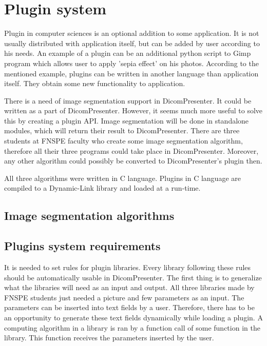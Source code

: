 \chapter*{Plugin system}

Plugin in computer sciences is an optional addition to some application. It is not usually distributed with application itself, but can be added by user according to his needs. An example of a plugin can be an additional python script to Gimp program which allows user to apply 'sepia effect' on his photos. According to the mentioned example, plugins can be written in another language than application itself. They obtain some new functionality to application.

There is a need of image segmentation support in DicomPresenter. It could be written as a part of DicomPresenter. However, it seems much more useful to solve this by creating a plugin API. Image segmentation will be done in standalone modules, which will return their result to DicomPresenter. There are three students at FNSPE faculty who create some image segmentation algorithm, therefore all their three programs could take place in DicomPresenter. Moreover, any other algorithm could possibly be converted to DicomPresenter's plugin then.

All three algorithms were written in C language. Plugins in C language are compiled to a Dynamic-Link library and loaded at a run-time.

\section*{Image segmentation algorithms}

\section*{Plugins system requirements}

It is needed to set rules for plugin libraries. Every library following these rules should be automatically usable in DicomPresenter. The first thing is to generalize what the libraries will need as an input and output. All three libraries made by FNSPE students just needed a picture and few parameters as an input. The parameters can be inserted into text fields by a user. Therefore, there has to be an opportunity to generate these text fields dynamically while loading a plugin. A computing algorithm in a library is ran by a function call of some function in the library. This function receives the parameters inserted by the user.


